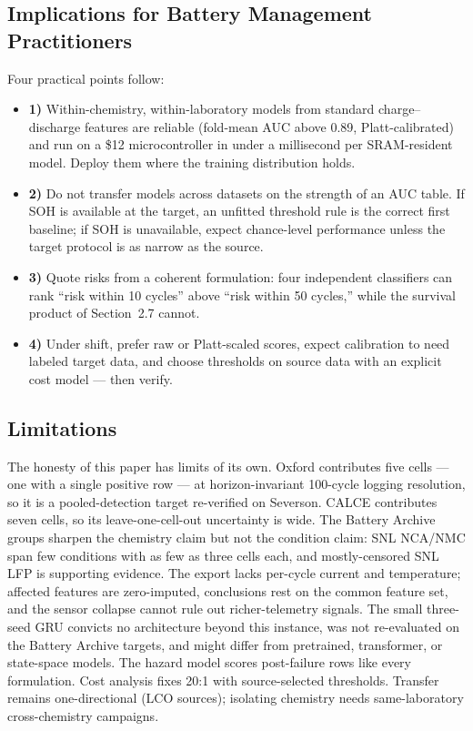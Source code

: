 \documentclass[preprint,12pt]{elsarticle}
\begin{document}
\subsection{Implications for Battery Management Practitioners}
Four practical points follow:
\begin{itemize}
\item \textbf{1)} Within-chemistry, within-laboratory models from standard charge--discharge features are reliable (fold-mean AUC above 0.89, Platt-calibrated) and run on a \$12 microcontroller in under a millisecond per SRAM-resident model. Deploy them where the training distribution holds.
\item \textbf{2)} Do not transfer models across datasets on the strength of an AUC table. If SOH is available at the target, an unfitted threshold rule is the correct first baseline; if SOH is unavailable, expect chance-level performance unless the target protocol is as narrow as the source.
\item \textbf{3)} Quote risks from a coherent formulation: four independent classifiers can rank ``risk within 10 cycles'' above ``risk within 50 cycles,'' while the survival product of Section~2.7 cannot.
\item \textbf{4)} Under shift, prefer raw or Platt-scaled scores, expect calibration to need labeled target data, and choose thresholds on source data with an explicit cost model --- then verify.
\end{itemize}

\subsection{Limitations}
The honesty of this paper has limits of its own. Oxford contributes five cells --- one with a single positive row --- at horizon-invariant 100-cycle logging resolution, so it is a pooled-detection target re-verified on Severson. CALCE contributes seven cells, so its leave-one-cell-out uncertainty is wide. The Battery Archive groups sharpen the chemistry claim but not the condition claim: SNL NCA/NMC span few conditions with as few as three cells each, and mostly-censored SNL LFP is supporting evidence. The export lacks per-cycle current and temperature; affected features are zero-imputed, conclusions rest on the common feature set, and the sensor collapse cannot rule out richer-telemetry signals. The small three-seed GRU convicts no architecture beyond this instance, was not re-evaluated on the Battery Archive targets, and might differ from pretrained, transformer, or state-space models. The hazard model scores post-failure rows like every formulation. Cost analysis fixes 20:1 with source-selected thresholds. Transfer remains one-directional (LCO sources); isolating chemistry needs same-laboratory cross-chemistry campaigns.
\end{document}
